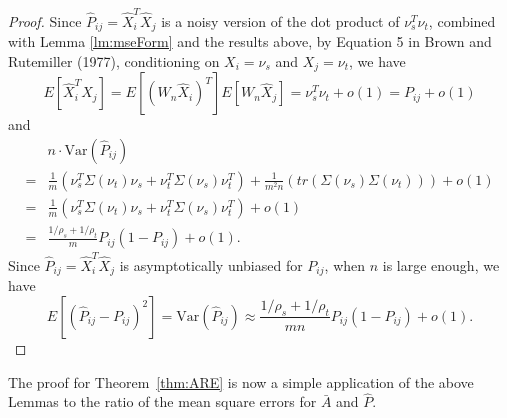 \documentclass[10pt,letterpaper]{article}
\newtheorem{theorem}[fact]{Theorem}
\begin{document}
\begin{proof}
Since $\hat{P}_{ij} = \hat{X}_i^T \hat{X}_j$ is a noisy version of the dot product of $\nu_s^T \nu_t$, combined with Lemma \ref{lm:mseForm} and the results above, by Equation 5 in Brown and Rutemiller (1977), conditioning on $X_i = \nu_s$ and $X_j = \nu_t$, we have
\[
	E[\hat{X}_i^T \hat{X}_j] = E[(W_n \hat{X}_i)^T] E[W_n \hat{X}_j] = \nu_s^T \nu_t+o(1) = P_{ij}+o(1)
\]
and
\begin{align*}
	& n \cdot \mathrm{Var} (\hat{P}_{ij}) \\
    = & \frac{1}{m} \left( \nu_s^T \Sigma(\nu_t) \nu_s + \nu_t^T \Sigma(\nu_s) \nu_t^T \right)
    + \frac{1}{m^2 n} \left( tr(\Sigma(\nu_s) \Sigma(\nu_t)) \right) +o(1)\\
    = & \frac{1}{m} \left( \nu_s^T \Sigma(\nu_t) \nu_s + \nu_t^T \Sigma(\nu_s) \nu_t^T \right)+o(1) \\
    = & \frac{1/\rho_s + 1/\rho_t}{m} P_{ij}(1-P_{ij}) + o(1).
\end{align*}
Since $\hat{P}_{ij} = \hat{X}_i^T \hat{X}_j$ is asymptotically unbiased for $P_{ij}$, when $n$ is large enough, we have
\[
    E[(\hat{P}_{ij} - P_{ij})^2] = \mathrm{Var}(\hat{P}_{ij}) \approx
    \frac{1/\rho_s + 1/\rho_t}{m n} P_{ij}(1-P_{ij})+o(1).
\]
\end{proof}






The proof for Theorem~\ref{thm:ARE} is now a simple application of the above Lemmas to the ratio of the mean square errors for $\bar{A}$ and $\hat{P}$.
\end{document}

